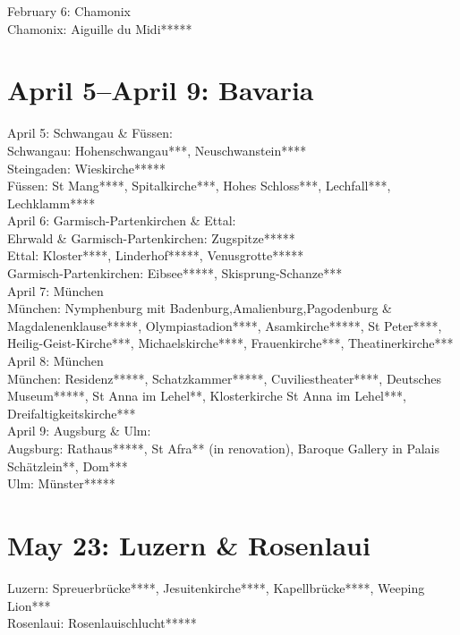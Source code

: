 February 6: Chamonix\\
Chamonix: Aiguille du Midi*****

\section{April 5--April 9: Bavaria}
\label{2010:Bavaria}

April 5: Schwangau \& F\"ussen:\\
Schwangau: Hohenschwangau***, Neuschwanstein****\\
Steingaden: Wieskirche*****\\
F\"ussen: St Mang****, Spitalkirche***, Hohes Schloss***, Lechfall***, Lechklamm****\\

April 6: Garmisch-Partenkirchen \& Ettal:\\
Ehrwald \& Garmisch-Partenkirchen: Zugspitze*****\\
Ettal: Kloster****, Linderhof*****, Venusgrotte*****\\
Garmisch-Partenkirchen: Eibsee*****, Skisprung-Schanze***\\

April 7: M\"unchen\\
M\"unchen: Nymphenburg mit Badenburg,Amalienburg,Pagodenburg \& Magdalenenklause*****, Olympiastadion****, Asamkirche*****, St Peter****, Heilig-Geist-Kirche***, Michaelskirche****, Frauenkirche***, Theatinerkirche***\\

April 8: M\"unchen\\
M\"unchen: Residenz*****, Schatzkammer*****, Cuviliestheater****, Deutsches Museum*****, St Anna im Lehel**, Klosterkirche St Anna im Lehel***, Dreifaltigkeitskirche***\\

April 9: Augsburg \& Ulm:\\
Augsburg: Rathaus*****, St Afra** (in renovation), Baroque Gallery in Palais Sch\"atzlein**, Dom***\\
Ulm: M\"unster*****

\section{May 23: Luzern \& Rosenlaui}
\label{2010:Luzern}

Luzern: Spreuerbr\"ucke****, Jesuitenkirche****, Kapellbr\"ucke****, Weeping Lion***\\
Rosenlaui: Rosenlauischlucht*****

